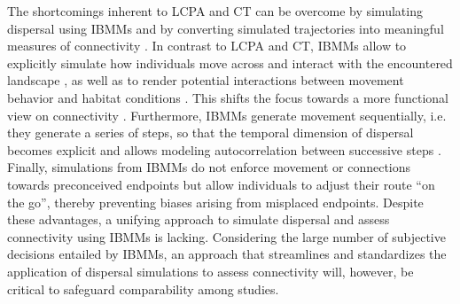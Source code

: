 \documentclass[abstract=on,10pt,a4paper,bibliography=totocnumbered]{article}
\begin{document}
The shortcomings inherent to LCPA and CT can be overcome by simulating dispersal
using IBMMs and by converting simulated trajectories into meaningful measures of
connectivity \citep{Diniz.2019}. In contrast to LCPA and CT, IBMMs allow to
explicitly simulate how individuals move across and interact with the
encountered landscape \citep{Kanagaraj.2013, Clark.2015, Allen.2016,
Hauenstein.2019, Zeller.2020}, as well as to render potential interactions
between movement behavior and habitat conditions \citep{Avgar.2016}. This shifts
the focus towards a more functional view on connectivity
\citep{Tischendorf.2000}. Furthermore, IBMMs generate movement sequentially,
i.e. they generate a series of steps, so that the temporal dimension of
dispersal becomes explicit and allows modeling autocorrelation between
successive steps \citep{Diniz.2019}. Finally, simulations from IBMMs do not
enforce movement or connections towards preconceived endpoints but allow
individuals to adjust their route  ``on the go'', thereby preventing biases
arising from misplaced endpoints. Despite these advantages, a unifying approach
to simulate dispersal and assess connectivity using IBMMs is lacking.
Considering the large number of subjective decisions entailed by IBMMs, an
approach that streamlines and standardizes the application of dispersal
simulations to assess connectivity will, however, be critical to safeguard
comparability among studies.
\end{document}
